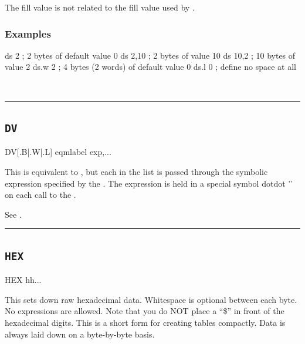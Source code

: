 The fill value is not related to the fill value used by .




\subsubsection{Examples}

\begin{code}[caption=Declaring Space]
 ds 2     ; 2 bytes of default value 0
 ds 2,10  ; 2 bytes of value 10
 ds 10,2  ; 10 bytes of value 2
 ds.w 2   ; 4 bytes (2 words) of default value 0
 ds.l 0   ; define no space at all
 \end{code}

\\

\hrule
\subsection{\texttt{DV}}
\label{pseudoop:dv}

\begin{usage}
  DV[{.B|.W|.L}] eqmlabel exp,...
\end{usage}

This is equivalent to , but each  in the list is passed
through the symbolic expression specified by the .
The expression is held in a special symbol dotdot '' on each
call to the .

See .\\

\hrule

\subsection{\texttt{HEX}}
\label{pseudoop:hex}

\begin{usage}
  HEX {hh...}
\end{usage}

This sets down raw hexadecimal data.  Whitespace is optional between each  byte.
No expressions are allowed.  Note that you do NOT place a ``\$''
in front of the hexadecimal digits.  This is a short form for creating
tables compactly.  Data is always laid down on a byte-by-byte
basis.

